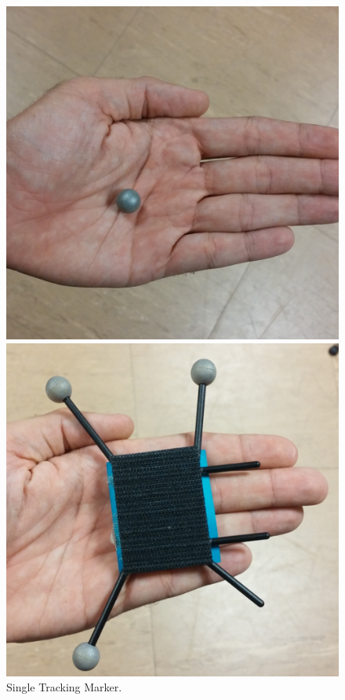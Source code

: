 \begin{figure}
  \centering
  \includegraphics[width=\linewidth]{imgs/impl/singlemarker.png}
    \caption{Single Tracking Marker.}
    \label{fig:singlemarker}
    \endminipage\hfill
{}
  \centering
  \includegraphics[width=\linewidth]{imgs/impl/markercombination.png}

\end{figure}
